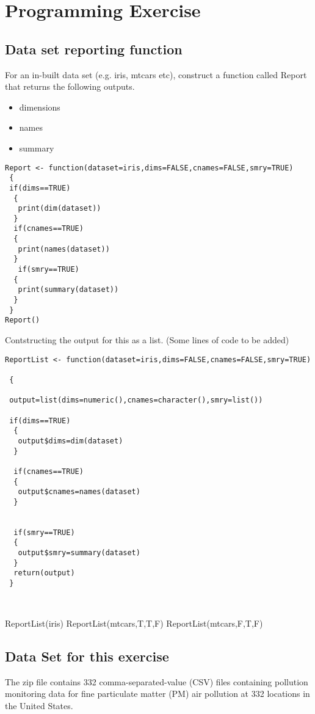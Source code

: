 \documentclass[12pt]{article}
\begin{document}
\tableofcontents
\newpage

\section{Programming Exercise}

\subsection{Data set reporting function}
For an in-built data set (e.g. iris, mtcars etc), construct a function called Report that returns
the following outputs.

\begin{itemize}
\item dimensions
\item names
\item summary
\end{itemize}

\begin{framed}
\begin{verbatim}
Report <- function(dataset=iris,dims=FALSE,cnames=FALSE,smry=TRUE)
 {
 if(dims==TRUE)
  {
   print(dim(dataset))
  }
  if(cnames==TRUE)
  {
   print(names(dataset))
  }
   if(smry==TRUE)
  {
   print(summary(dataset))
  }
 }
Report()
\end{verbatim}
\end{framed}
\newpage
Contstructing the output for this as a list. (Some lines of code to be added)

\begin{framed}
\begin{verbatim}
ReportList <- function(dataset=iris,dims=FALSE,cnames=FALSE,smry=TRUE)

 {

 output=list(dims=numeric(),cnames=character(),smry=list())

 if(dims==TRUE)
  {
   output$dims=dim(dataset)
  }

  if(cnames==TRUE)
  {
   output$cnames=names(dataset)
  }


  if(smry==TRUE)
  {
   output$smry=summary(dataset)
  }
  return(output)
 }



\end{verbatim}
\end{framed}

ReportList(iris)
ReportList(mtcars,T,T,F)
ReportList(mtcars,F,T,F)


\subsection{Data Set for this exercise}
The zip file contains 332 comma-separated-value (CSV) files containing pollution monitoring data for fine particulate matter (PM) air pollution at 332 locations in the United States. 
\end{document}
